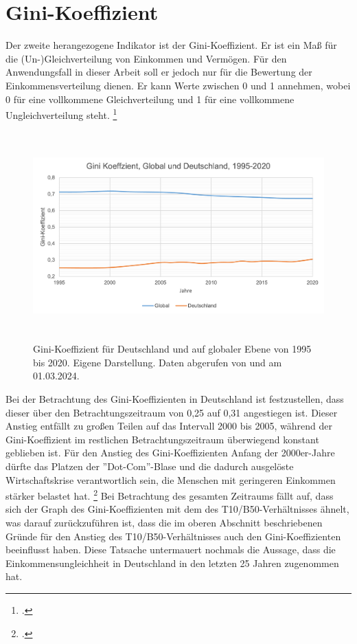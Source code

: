 \section{Gini-Koeffizient}

Der zweite herangezogene Indikator ist der Gini-Koeffizient. Er ist ein Ma{\ss} für die (Un-)Gleichverteilung von Einkommen und Vermögen. Für den Anwendungsfall in dieser Arbeit soll er jedoch nur für die Bewertung der Einkommensverteilung dienen. Er kann Werte zwischen 0 und 1 annehmen, wobei 0 für eine vollkommene Gleichverteilung und 1 für eine vollkommene Ungleichverteilung steht. \footcite[Vgl.][]{gini_definition_diw_2024}

\begin{figure}[h]
    \centering
    \includegraphics[height=8cm]{Bilder/Gini-Koeffizient2.png}
    \caption[Gini-Koeffizient, Deutschland und global, 1995-2020]{Gini-Koeffizient für Deutschland und auf globaler Ebene von 1995 bis 2020. Eigene Darstellung. Daten abgerufen von \cite[][, S.56 (global)]{wir_2022} und \cite[][(Deutschland)]{bmas_arb_gini_2020} am 01.03.2024.}
    \label{fig:iso_norm}
\end{figure}

Bei der Betrachtung des Gini-Koeffizienten in Deutschland ist festzustellen, dass dieser über den Betrachtungszeitraum von 0,25 auf 0,31 angestiegen ist. Dieser Anstieg entfällt zu gro{\ss}en Teilen auf das Intervall 2000 bis 2005, während der Gini-Koeffizient im restlichen Betrachtungszeitraum überwiegend konstant geblieben ist. Für den Anstieg des Gini-Koeffizienten Anfang der 2000er-Jahre dürfte das Platzen der ''Dot-Com''-Blase und die dadurch ausgelöste Wirtschaftskrise verantwortlich sein, die Menschen mit geringeren Einkommen stärker belastet hat. \footcite[Vgl. ][S. 3]{horn_wirtschaftskrise_2014} Bei Betrachtung des gesamten Zeitraums fällt auf, dass sich der Graph des Gini-Koeffizienten mit dem des T10/B50-Verhältnisses ähnelt, was darauf zurückzuführen ist, dass die im oberen Abschnitt beschriebenen Gründe für den Anstieg des T10/B50-Verhältnisses auch den Gini-Koeffizienten beeinflusst haben. Diese Tatsache untermauert nochmals die Aussage, dass die Einkommensungleichheit in Deutschland in den letzten 25 Jahren zugenommen hat.

